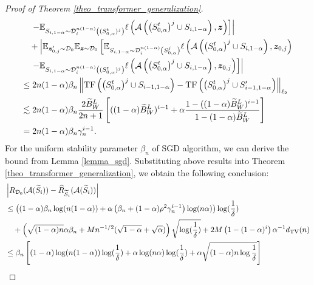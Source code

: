 \begin{proof}[Proof of Theorem \ref{theo_transformer_generalization}]
\begin{align}
&\left.\left. \quad-\mathbb{E}_{S_{i,1-\alpha} \sim \mathcal{D}_i^{n(1-\alpha)}\left((S_{0,\alpha}^t)^j\right)} \ell\left(\mathcal{A}\left(\left(S_{0, \alpha}^t\right)^j \cup S_{i, 1-\alpha}\right), \boldsymbol{z}\right)\right]\right|  \notag\\
&\quad+\left|\mathbb{E}_{\boldsymbol{z}_{0,j}^{\prime} \sim \mathcal{D}_0} \mathbb{E}_{\boldsymbol{z} \sim \mathcal{D}_0}\left[\mathbb{E}_{S_{i,1-\alpha} \sim \mathcal{D}_i^{n(1-\alpha)}\left(S_{0,\alpha}^j\right)} \ell\left(\mathcal{A}\left(\left(S_{0, \alpha}^t\right)^j \cup S_{i, 1-\alpha}\right), \boldsymbol{z}_{0, j}\right)\right. \right.\notag \\
&\left.\left. \quad-\mathbb{E}_{S_{i,1-\alpha} \sim \mathcal{D}_i^{n(1-\alpha)}\left((S_{0,\alpha}^t)^j\right)} \ell\left(\mathcal{A}\left(\left(S_{0, \alpha}^t\right)^j \cup S_{i, 1-\alpha}\right), \boldsymbol{z}_{0, j}\right)\right]\right|  \notag\\
&\leq 2n(1-\alpha)\beta_n \left\|\mathrm{TF}\left(\left(S_{0, \alpha}^t\right)^j \cup S_{i-1, 1-\alpha}\right)-\mathrm{TF}\left(\left(S_{0, \alpha}^t\right)^j \cup S_{i-1, 1-\alpha}^{\prime}\right)\right\|_{\ell_2}\notag \\
&\lesssim 2n(1-\alpha)\beta_n \frac{2\widetilde{B}_W^L}{2n+1}\left[((1-\alpha)\widetilde{B}_W^L)^{i-1}+\alpha\frac{1-((1-\alpha)\widetilde{B}_W^L)^{i-1}}{1-(1-\alpha)\widetilde{B}_W^L}\right]\notag\\ 
&=2n(1-\alpha)\beta_n \gamma_n^{i-1}.
\end{align} 
 For the uniform stability parameter $\beta_n$ of SGD algorithm, we can derive the bound from Lemma \ref{lemma_sgd}. Substituting above results into Theorem \ref{theo_transformer_generalization}, we obtain the following conclusion:
 \begin{align}
&\left|R_{\mathcal{D}_0}(\mathcal{A}(\widetilde{S}_i))-\widehat{R}_{\widetilde{S}_i}(\mathcal{A}(\widetilde{S}_i))\right|\notag \\
&\leq \left((1-\alpha) \beta_n \log (n(1-\alpha))+\alpha\left(\beta_n+(1-\alpha)\rho^2\gamma_n^{i-1}\right) \log (n \alpha)\right) \log (\frac{1}{\delta})\notag \\
&\quad +\left(\sqrt{(1-\alpha) n} \alpha \beta_n+M n^{-1 / 2}(\sqrt{1-\alpha}+\sqrt{\alpha})\right) \sqrt{\log (\frac{1}{\delta})}+2 M\left(1-(1-\alpha)^i\right) \alpha^{-1} d_{\mathrm{TV}}(n)\notag \\
&\leq \beta_n\left[ (1-\alpha)\log(n(1-\alpha))\log (\frac{1}{\delta})+\alpha \log (n\alpha)\log (\frac{1}{\delta})+\alpha\sqrt{(1-\alpha)n \log \frac{1}{\delta}}\right]\notag \\

\end{align}
\end{proof}
